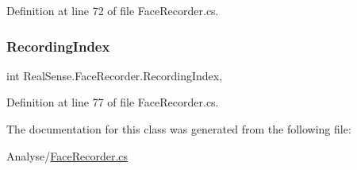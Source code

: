 Definition at line 72 of file Face\+Recorder.\+cs.

\mbox{\label{class_real_sense_1_1_face_recorder_a4f1a094d0321d299feb5aa0e3553b506}} 
\subsubsection{\texorpdfstring{Recording\+Index}{RecordingIndex}}
{\footnotesize\ttfamily int Real\+Sense.\+Face\+Recorder.\+Recording\+Index\hspace{0.3cm}{\ttfamily [get]}, {\ttfamily [set]}}



Definition at line 77 of file Face\+Recorder.\+cs.



The documentation for this class was generated from the following file\+:\begin{DoxyCompactItemize}
\item 
Analyse/\hyperlink{_face_recorder_8cs}{Face\+Recorder.\+cs}\end{DoxyCompactItemize}
